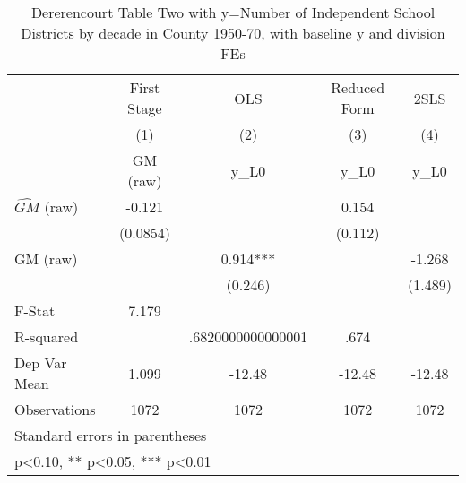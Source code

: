 \begin{table}[htbp]\centering
\def\sym#1{\ifmmode^{#1}\else\(^{#1}\)\fi}
\caption{Dererencourt Table Two with y=Number of Independent School Districts by decade in County 1950-70, with baseline y and division FEs}
\begin{tabular}{l*{4}{c}}
\toprule
                    & First Stage   &         OLS   &Reduced Form   &        2SLS   \\
                    &\multicolumn{1}{c}{(1)}&\multicolumn{1}{c}{(2)}&\multicolumn{1}{c}{(3)}&\multicolumn{1}{c}{(4)}\\
                    &\multicolumn{1}{c}{GM  (raw)}&\multicolumn{1}{c}{y\_L0}&\multicolumn{1}{c}{y\_L0}&\multicolumn{1}{c}{y\_L0}\\
\midrule
$\hat{GM}$ (raw)    &      -0.121   &               &       0.154   &               \\
                    &    (0.0854)   &               &     (0.112)   &               \\
\addlinespace
GM  (raw)           &               &       0.914***&               &      -1.268   \\
                    &               &     (0.246)   &               &     (1.489)   \\
\midrule
F-Stat              &       7.179   &               &               &               \\
R-squared           &               &.6820000000000001   &        .674   &               \\
Dep Var Mean        &       1.099   &      -12.48   &      -12.48   &      -12.48   \\
Observations        &        1072   &        1072   &        1072   &        1072   \\
\bottomrule
\multicolumn{5}{l}{\footnotesize Standard errors in parentheses}\\
\multicolumn{5}{l}{\footnotesize * p<0.10, ** p<0.05, *** p<0.01}\\
\end{tabular}
\end{table}
